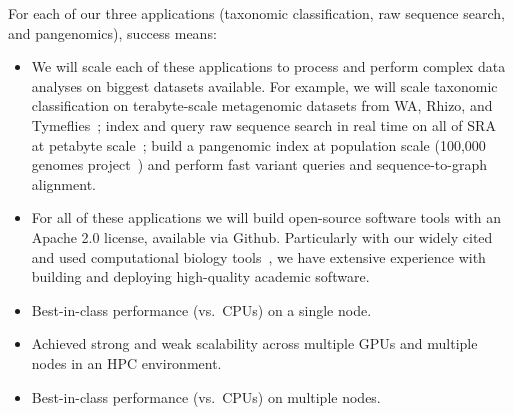 For each of our three applications (taxonomic classification, raw sequence search, and pangenomics), success means:

\begin{itemize}[noitemsep]
  \item We will scale each of these applications to process and perform complex data analyses on biggest datasets available. For example, we will scale taxonomic classification on terabyte-scale metagenomic datasets from WA, Rhizo, and Tymeflies~\cite{hofmeyr2020terabase}; index and query raw sequence search in real time on all of SRA at petabyte scale~\cite{kodama2012sequence}; build a pangenomic index at population scale (100,000 genomes project~\cite{1002021100}) and perform fast variant queries and sequence-to-graph alignment.
  \item For all of these applications we will build open-source software tools with an Apache 2.0 license, available via Github. Particularly with our widely cited and used computational biology tools~\cite{PandeyABFJP18Cell,PandeyBJP17a,PandeyBJP17b,PandeyBJP17,pandey2020timely,pandey2021variantstore,pandey2021terrace,pandey2022iceberght}, we have extensive experience with building and deploying high-quality academic software.
  \item Best-in-class performance (vs.\ CPUs) on a single node.
  \item Achieved strong and weak scalability across multiple GPUs and multiple nodes in an HPC environment. 
  \item Best-in-class performance (vs.\ CPUs) on multiple nodes.
\end{itemize}
